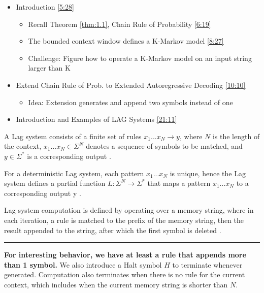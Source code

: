 \documentclass[12pt, twoside]{article}
\begin{document}
\begin{itemize}
    \item Introduction \href{https://youtu.be/ShM-T4oeYjw?si=fsZwObn6LdUuPIMA}{[5:28]}
    \begin{itemize}
        \item Recall Theorem \ref{thm:1.1}, Chain Rule of Probability \href{https://youtu.be/ShM-T4oeYjw?si=xZnM8GOIv6OGB-Ra&t=379}{[6:19]}
        \item The bounded context window defines a K-Markov model \href{https://youtu.be/ShM-T4oeYjw?si=PZ1ZMbLjJaIqu7_Q&t=501}{[8:27]}
        \item Challenge: Figure how to operate a K-Markov model on an input string larger than K
    \end{itemize}
    \item Extend Chain Rule of Prob. to Extended Autoregressive Decoding \href{https://youtu.be/ShM-T4oeYjw?si=e4lvOWzkCGe_ClLH}{[10:10]}
    \begin{itemize}
        \item Idea: Extension generates and append two symbols instead of one
    \end{itemize}
    \item Introduction and Examples of LAG Systems \href{https://youtu.be/ShM-T4oeYjw?si=QOeX4wHOR30GQbBF&t=1271}{[21:11]}
\end{itemize}
\begin{definition}
A Lag system consists of a finite set of rules $x_1...x_N \to y$, where $N$ is the length of the context, $x_1...x_N \in \Sigma^N$ denotes a sequence of symbols to be matched, and $y \in \Sigma^*$ is a corresponding output \cite{schuurmans2024autoregressive}.

For a deterministic Lag system, each pattern $x_1...x_N$ is unique, hence the Lag system defines a partial function $L : \Sigma^N \to \Sigma^*$ that maps a pattern $x_1...x_N$ to a corresponding output y \cite{schuurmans2024autoregressive}.

Lag system computation is defined by operating over a memory string, where in each iteration, a rule is matched to the prefix of the memory string, then the result appended to the string, after which the first symbol is deleted \cite{schuurmans2024autoregressive}.
\end{definition}
\hrule
\textbf{For interesting behavior, we have at least a rule that appends more than 1 symbol.} We also introduce a Halt symbol $H$ to terminate whenever generated. Computation also terminates when there is no rule for the current context, which includes when the current memory string is shorter than $N$.
\end{document}
